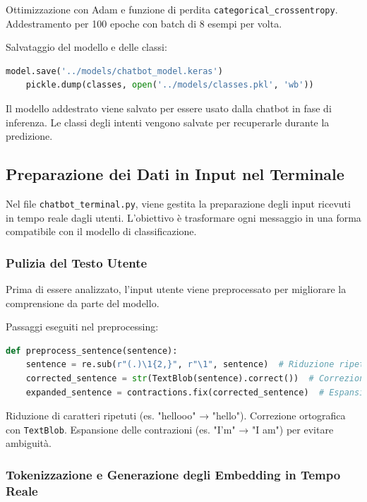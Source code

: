 \documentclass[12pt, letterpaper]{article}
\begin{document}
Ottimizzazione con Adam e funzione di perdita \texttt{categorical\_crossentropy}. Addestramento per 100 epoche con batch di 8 esempi per volta.

Salvataggio del modello e delle classi:

\begin{lstlisting}[language=Python]
	model.save('../models/chatbot_model.keras')
	pickle.dump(classes, open('../models/classes.pkl', 'wb'))
\end{lstlisting}

Il modello addestrato viene salvato per essere usato dalla chatbot in fase di inferenza. Le classi degli intenti vengono salvate per recuperarle durante la predizione.

\subsection{Preparazione dei Dati in Input nel Terminale}

Nel file \texttt{chatbot\_terminal.py}, viene gestita la preparazione degli input ricevuti in tempo reale dagli utenti. L'obiettivo è trasformare ogni messaggio in una forma compatibile con il modello di classificazione.

\subsubsection{Pulizia del Testo Utente}

Prima di essere analizzato, l'input utente viene preprocessato per migliorare la comprensione da parte del modello.

Passaggi eseguiti nel preprocessing:

\begin{lstlisting}[language=Python]
	def preprocess_sentence(sentence):
	sentence = re.sub(r"(.)\1{2,}", r"\1", sentence)  # Riduzione ripetizioni di caratteri
	corrected_sentence = str(TextBlob(sentence).correct())  # Correzione ortografica
	expanded_sentence = contractions.fix(corrected_sentence)  # Espansione delle contrazioni
\end{lstlisting}

Riduzione di caratteri ripetuti (es. "hellooo" → "hello"). Correzione ortografica con \texttt{TextBlob}. Espansione delle contrazioni (es. "I'm" → "I am") per evitare ambiguità.

\subsubsection{Tokenizzazione e Generazione degli Embedding in Tempo Reale}
\end{document}
